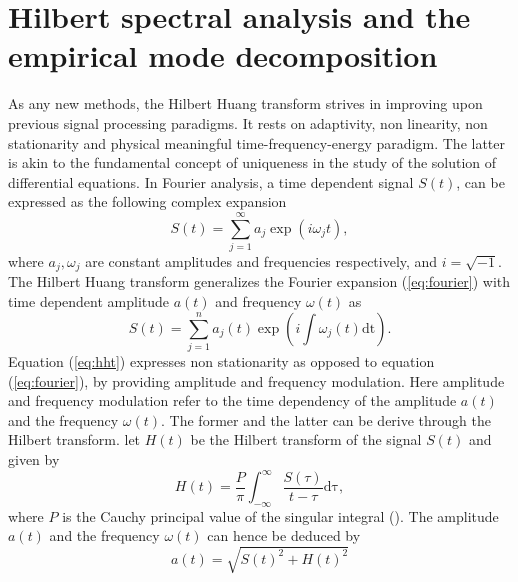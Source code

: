 \documentclass[../Main/thesis.tex]{subfiles}
\begin{document}
\section{Hilbert spectral analysis and the empirical mode decomposition}
\label{sec:emd}
As any new methods, the Hilbert Huang transform strives in improving upon previous signal processing paradigms. It rests on adaptivity, non linearity, non stationarity and physical meaningful time-frequency-energy paradigm. The latter is akin to the fundamental concept of uniqueness in the study of the solution of differential equations. 
In Fourier analysis, a time dependent signal $S(t)$, can be expressed as the following complex expansion
\begin{equation} \label{eq:fourier}
S(t) = \sum_{j=1}^{\infty}a_{j}\exp(i\omega_{j}t),
\end{equation}
where $a_{j}, \omega_{j}$ are constant amplitudes and frequencies respectively, and $i = \sqrt{-1}$. The Hilbert Huang transform generalizes the Fourier expansion (\ref{eq:fourier}) with time dependent amplitude $a(t)$ and frequency $\omega(t)$ as 
\begin{equation} \label{eq:hht}
S(t) = \sum_{j=1}^{n}a_{j}(t)\exp\left(i\int \omega_{j}(t)\mathrm{dt}\right).
\end{equation}
Equation (\ref{eq:hht}) expresses non stationarity as opposed to equation (\ref{eq:fourier}), by providing amplitude and frequency modulation. Here amplitude and frequency modulation refer to the time dependency of the amplitude $a(t)$ and the frequency $\omega(t)$. The former and the latter can be derive through the Hilbert transform. let $H(t)$ be the Hilbert transform of the signal $S(t)$ and given by
\begin{equation}\label{eq:hilbert}
H(t) = \frac{P}{\pi}\int_{-\infty}^{\infty}\frac{S(\tau)}{t-\tau}\mathrm{d\tau},
\end{equation}
where $P$ is the Cauchy principal value of the singular integral (\cite{huang08}). The amplitude $a(t)$ and the frequency $\omega(t)$
can hence be deduced by 
\begin{equation}\label{eq:amplitude}
a(t) = \sqrt{S(t)^{2} + H(t)^{2}}
\end{equation}
\end{document}

